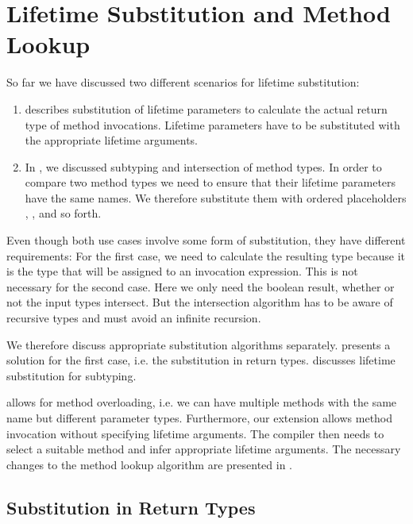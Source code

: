 \section{Lifetime Substitution and Method Lookup}\label{section:substitution-and-lookup}

So far we have discussed two different scenarios for lifetime substitution:
\begin{enumerate}
\item {} describes substitution of lifetime parameters to calculate the actual return type of method invocations.
Lifetime parameters have to be substituted with the appropriate lifetime arguments.

\item In , we discussed subtyping and intersection of method types.
In order to compare two method types we need to ensure that their lifetime parameters have the same names.
We therefore substitute them with ordered placeholders , , and so forth.
\end{enumerate}

\noindent Even though both use cases involve some form of substitution, they have different requirements:
For the first case, we need to calculate the resulting type because it is the type that will be assigned to an invocation expression.
This is not necessary for the second case.
Here we only need the boolean result, whether or not the input types intersect.
But the intersection algorithm has to be aware of recursive types and must avoid an infinite recursion.

We therefore discuss appropriate substitution algorithms separately.
 presents a solution for the first case, i.e. the substitution in return types.
 discusses lifetime substitution for subtyping.

\whiley allows for method overloading, i.e. we can have multiple methods with the same name but different parameter types.
Furthermore, our extension allows method invocation without specifying lifetime arguments.
The compiler then needs to select a suitable method and infer appropriate lifetime arguments.
The necessary changes to the method lookup algorithm are presented in .


\subsection{Substitution in Return Types}\label{section:substitution-return-type}
